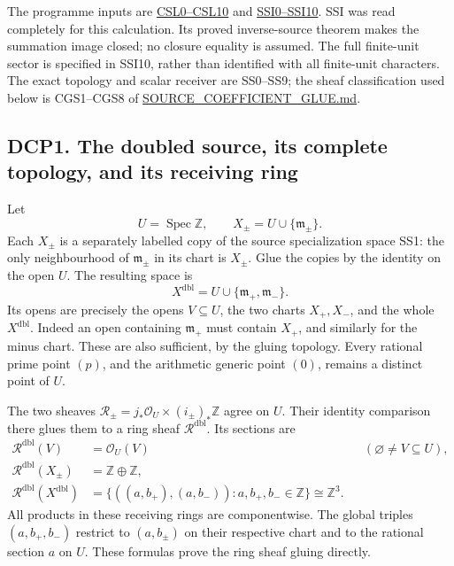 The programme inputs are
\href{https://github.com/KokunoYumeto/zeta-function-research-reader/blob/main/workbenches/splitzero-tandem/continuations/20260924-cohomology-weight-and-character-lifts/gct-weight-control/proofs/CC_SUPPORTED_LOCALIZATION_AND_WEIGHT_MAPS.md}{CSL0--CSL10}
and
\href{https://github.com/KokunoYumeto/zeta-function-research-reader/blob/main/workbenches/splitzero-tandem/continuations/20260924-cohomology-weight-and-character-lifts/gct-weight-control/proofs/EXACT_SCHWARTZ_SUMMATION_IMAGE.md}{SSI0--SSI10}.
SSI was read completely for this calculation. Its proved inverse-source
theorem makes the summation image closed; no closure equality is
assumed. The full finite-unit sector is specified in SSI10, rather than
identified with all finite-unit characters. The exact topology and
scalar receiver are SS0--SS9; the sheaf classification used below is
CGS1--CGS8 of \url{SOURCE_COEFFICIENT_GLUE.md}.

\subsection{DCP1. The doubled source, its complete topology, and its
receiving
ring}\label{dcp1.-the-doubled-source-its-complete-topology-and-its-receiving-ring}

Let \[
 U=\operatorname{Spec}\mathbb Z,\qquad
 X_\pm=U\cup\{\mathfrak m_\pm\}.
\] Each \(X_\pm\) is a separately labelled copy of the source
specialization space SS1: the only neighbourhood of \(\mathfrak m_\pm\)
in its chart is \(X_\pm\). Glue the copies by the identity on the open
\(U\). The resulting space is \[
 X^{\mathrm{dbl}}=U\cup\{\mathfrak m_+,\mathfrak m_-\}.
\tag{DCP1.1}
\] Its opens are precisely the opens \(V\subseteq U\), the two charts
\(X_+,X_-\), and the whole \(X^{\mathrm{dbl}}\). Indeed an open
containing \(\mathfrak m_+\) must contain \(X_+\), and similarly for the
minus chart. These are also sufficient, by the gluing topology. Every
rational prime point \((p)\), and the arithmetic generic point \((0)\),
remains a distinct point of \(U\).

The two sheaves
\(\mathcal R_\pm=j_*\mathcal O_U\times(i_\pm)_*\mathbb Z\) agree on
\(U\). Their identity comparison there glues them to a ring sheaf
\(\mathcal R^{\mathrm{dbl}}\). Its sections are \[
\begin{aligned}
 \mathcal R^{\mathrm{dbl}}(V)&=\mathcal O_U(V) &&(\varnothing\ne V\subseteq U),\\
 \mathcal R^{\mathrm{dbl}}(X_\pm)&=\mathbb Z\oplus\mathbb Z,\\
 \mathcal R^{\mathrm{dbl}}(X^{\mathrm{dbl}})
 &=\{((a,b_+),(a,b_-)):a,b_+,b_-\in\mathbb Z\}
 \cong\mathbb Z^3 .
\end{aligned}
\tag{DCP1.2}
\] All products in these receiving rings are componentwise. The global
triples \((a,b_+,b_-)\) restrict to \((a,b_\pm)\) on their respective
chart and to the rational section \(a\) on \(U\). These formulas prove
the ring sheaf gluing directly.

